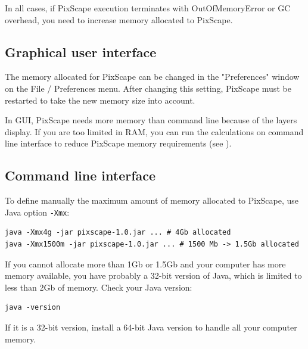 \documentclass{report}
\begin{document}
In all cases, if PixScape execution terminates with OutOfMemoryError
or GC overhead, you need to increase memory allocated to PixScape.


\subsection{Graphical user interface}
The memory allocated for PixScape can be changed in the "Preferences" window on the File / Preferences menu. After changing this setting, PixScape must be restarted to take the new memory size into account.

In GUI, PixScape needs more memory than command line because of the layers display. If you are too limited in RAM, you can run the calculations on command line interface to reduce PixScape memory requirements (see ).

\subsection{Command line interface}
To define manually the maximum amount of memory allocated to PixScape, use Java option \verb|-Xmx|:

\begin{Verbatim}
java -Xmx4g -jar pixscape-1.0.jar ... # 4Gb allocated
java -Xmx1500m -jar pixscape-1.0.jar ... # 1500 Mb -> 1.5Gb allocated
\end{Verbatim}

If you cannot allocate more than 1Gb or 1.5Gb and your computer has more memory available, you have
probably a 32-bit version of Java, which is limited to less than 2Gb of memory.  Check your Java version:
\begin{Verbatim}
java -version
\end{Verbatim}
If it is a 32-bit version, install a 64-bit Java version to handle all your computer memory.


\end{document}
